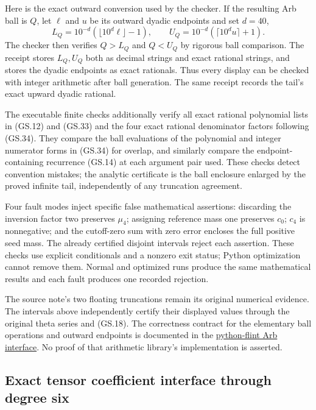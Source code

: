 Here is the exact outward conversion used by the checker. If the
resulting Arb ball is $Q$, let $\ell$ and $u$ be its outward
dyadic endpoints and set $d=40$,
\begin{equation}
 L_Q=10^{-d}(\lfloor10^d\ell\rfloor-1),\qquad
 U_Q=10^{-d}(\lceil10^d u\rceil+1).\tag{GS.37}
\end{equation}
The checker then verifies $Q>L_Q$ and $Q<U_Q$ by rigorous ball
comparison. The receipt stores $L_Q,U_Q$ both as decimal strings
and exact rational strings, and stores the dyadic endpoints as
exact rationals. Thus every display can be checked with integer
arithmetic after ball generation. The same receipt records the
tail's exact upward dyadic rational.

The executable finite checks additionally verify all exact rational
polynomial lists in (GS.12) and (GS.33) and the four exact rational
denominator factors following (GS.34). They compare the ball evaluations
of the polynomial and integer numerator forms in (GS.34) for overlap,
and similarly compare the endpoint-containing recurrence (GS.14)
at each argument pair used. These checks detect convention mistakes;
the analytic certificate is the ball enclosure enlarged by the
proved infinite tail, independently of any truncation agreement.

Four fault modes inject specific false mathematical assertions:
discarding the inversion factor two preserves $\mu_4$; assigning
reference mass one preserves $c_0$; $c_4$ is nonnegative; and the
cutoff-zero sum with zero error encloses the full positive seed
mass. The already certified disjoint intervals reject each assertion.
These checks use explicit conditionals and a nonzero exit status;
Python optimization cannot remove them. Normal and optimized runs
produce the same mathematical results and each fault produces one
recorded rejection.

The source note's two floating truncations remain its original
numerical evidence. The intervals above independently certify their
displayed values through the original theta series and (GS.18).
The correctness contract for the elementary ball operations and
outward endpoints is documented in the
\href{https://python-flint.readthedocs.io/en/latest/arb.html}{python-flint Arb interface}.
No proof of that arithmetic library's implementation is asserted.

\subsection{Exact tensor coefficient interface through degree six}

